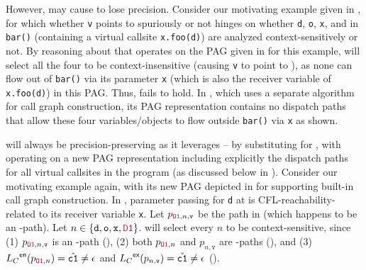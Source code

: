 However, \selectx may  cause  to lose precision.
Consider  our motivating example given in
, 
for which whether  \texttt{v}  
points to  spuriously or not
hinges on whether \texttt{d}, \texttt{o}, \texttt{x}, and
 in \texttt{bar()} (containing a virtual callsite
\texttt{x.foo(d)})
are analyzed context-sensitively or not. By reasoning about \manuLFC that
operates on the  PAG  given in 
 for this example,
\selectx will select all the four to be
context-insensitive (causing \texttt{v}  to 
point to ), as none can flow out of 
\texttt{bar()} via its parameter \texttt{x} (which is also the 
receiver variable of \texttt{x.foo(d)})
in this PAG.
Thus,  \selconThree fails to hold. In \manuLFC, which uses a separate algorithm 
for call graph construction, its PAG representation contains no dispatch paths that allow  these
 four variables/objects to flow outside \texttt{bar()} via  \texttt{x} as shown.

 
 \tool will always be precision-preserving as it leverages
 \selconOne -- \selconThree by  substituting
 \LF for \manuLF, with \LFC
 operating on a new PAG representation including explicitly the dispatch paths for all
 virtual callsites in the program (as discussed below in
 ).
 Consider our motivating example again, with its new
  PAG depicted in  for supporting built-in
  call graph construction.
 In \LF, parameter passing for \texttt{d} at   
is  CFL-reachability-related to its receiver variable \texttt{x}. 
Let $p_{{{\color{purple}\texttt{O1}}},n,\texttt{v}}$ be
 the path
 in  (which happens to be an \LFC-path).
Let $n\in \{
\texttt{d}, \texttt{o}, \texttt{x}, 
{\color{purple}\texttt{D1}}
\}$.
\tool  will select every $n$ to be context-sensitive,
since (1) $p_{{\color{purple}\texttt{O1}},n,\texttt{v}}$ is an \LF-path
(\selconOne), (2) both $p_{{\color{purple}\texttt{O1}},n}$ and
$p_{n,\texttt{v}}$ are \LC-paths (\selconTwo),  and (3)
$\mbox{${L}_C$}^\textsf{en}(p_{{\color{purple}\texttt{O1}},n})=\hat{\texttt{c1}}\neq \epsilon$ and
$\mbox{${L}_C$}^\textsf{ex}(p_{n,\texttt{v}})=\check{\texttt{c1}}\neq \epsilon$
(\selconThree).

